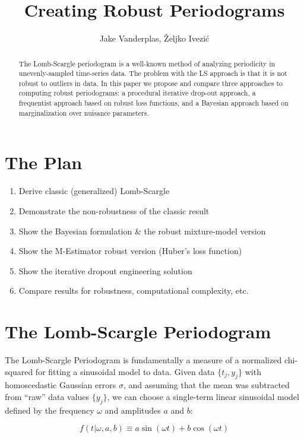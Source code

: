 \documentclass[12pt,pdftex]{article}
\title{Creating Robust Periodograms}
\author{Jake Vanderplas, \v{Z}eljko Ivezi\'{c}}
\begin{document}
\maketitle

\begin{abstract}
The Lomb-Scargle periodogram is a well-known method of analyzing periodicity in unevenly-sampled time-series data. The problem with the LS approach is that it is not robust to outliers in data. In this paper we propose and compare three approaches to computing robust periodograms: a procedural iterative drop-out approach, a frequentist approach based on robust loss functions, and a Bayesian approach based on marginalization over nuisance parameters.
\end{abstract}

\section{The Plan}
\begin{enumerate}
  \item Derive classic (generalized) Lomb-Scargle
  \item Demonstrate the non-robustness of the classic result
  \item Show the Bayesian formulation \& the robust mixture-model version
  \item Show the M-Estimator robust version (Huber's loss function)
  \item Show the iterative dropout engineering solution
  \item Compare results for robustness, computational complexity, etc.
\end{enumerate}

\section{The Lomb-Scargle Periodogram}
The Lomb-Scargle Periodogram is fundamentally a measure of a normalized chi-squared for fitting a sinusoidal model to data. Given data $\{t_j, y_j\}$ with homoscedastic Gaussian errors $\sigma$, and assuming that the mean was subtracted from ``raw'' data
values $\{y_j\}$, we can choose a single-term linear sinusoidal model defined by the frequency $\omega$ and amplitudes $a$ and $b$:

\begin{equation}
  f(t|\omega, a, b) \equiv a\sin(\omega t) + b\cos(\omega t)
\end{equation}
\end{document}
